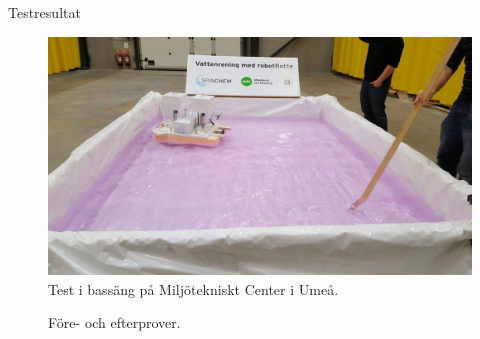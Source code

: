 \documentclass[final]{beamer}
\newlength{\onecolwid}
\begin{document}
\begin{frame}[t]
\begin{columns}[t, totalwidth=0.99\textwidth]
\begin{column}{\onecolwid}
\begin{block}{Testresultat}
        \vskip 2cm
        \begin{figure}[H]
          \centering
          \includegraphics[width=\linewidth]{figures/pool.jpeg}
          \caption{Test i bassäng på Miljötekniskt Center i Umeå.}
        \end{figure}

        \vskip 2cm
        \begin{figure}[H]
          \centering
          \caption{Före- och efterprover.}
        \end{figure}

      \end{block}

    \end{column}

  \end{columns} %

\end{frame} %
\end{document}
